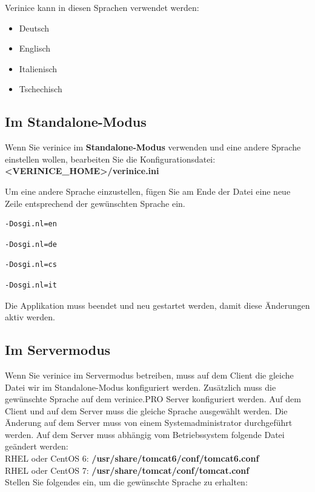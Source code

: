 \documentclass[a4paper,10pt]{book}
\begin{document}
Verinice kann in diesen Sprachen verwendet werden:
\begin{itemize}
 \item Deutsch
 \item Englisch
 \item Italienisch
 \item Tschechisch
\end{itemize}

\subsection{Im Standalone-Modus}
Wenn Sie verinice im \textbf{Standalone-Modus} verwenden und eine andere Sprache einstellen wollen, bearbeiten Sie die Konfigurationsdatei:
\newline\\
\textbf{\textless VERINICE\_HOME\textgreater/verinice.ini}

Um eine andere Sprache einzustellen, fügen Sie am Ende der Datei eine neue Zeile
entsprechend der gewünschten Sprache ein.

\begin{lstlisting}[language=Plain, caption={verinice.ini Englisch}]
-Dosgi.nl=en
\end{lstlisting}

\begin{lstlisting}[language=Plain, caption={verinice.ini Deutsch}]
-Dosgi.nl=de
\end{lstlisting}

\begin{lstlisting}[language=Plain, caption={verinice.ini Tschechisch}]
-Dosgi.nl=cs
\end{lstlisting}

\begin{lstlisting}[language=Plain, caption={verinice.ini Italienisch}]
-Dosgi.nl=it
\end{lstlisting}

Die Applikation muss beendet und neu gestartet werden, damit diese Änderungen aktiv werden.

\subsection{Im Servermodus}
Wenn Sie verinice im Servermodus betreiben, muss auf dem Client die gleiche Datei wir im Standalone-Modus konfiguriert werden. Zusätzlich muss die gewünschte Sprache auf dem verinice.\textsc{PRO} Server konfiguriert werden. Auf dem Client und auf dem Server muss die gleiche Sprache ausgewählt werden. Die Änderung auf dem Server muss von einem Systemadministrator durchgeführt werden. Auf dem Server muss abhängig vom Betriebssystem folgende Datei geändert werden:
\newline\\ 
RHEL oder CentOS 6:
\textbf{/usr/share/tomcat6/conf/tomcat6.conf} 
\newline\\
RHEL oder CentOS 7:
\textbf{/usr/share/tomcat/conf/tomcat.conf} 
\newline\\
Stellen Sie folgendes ein, um die gewünschte Sprache zu erhalten:
\end{document}
